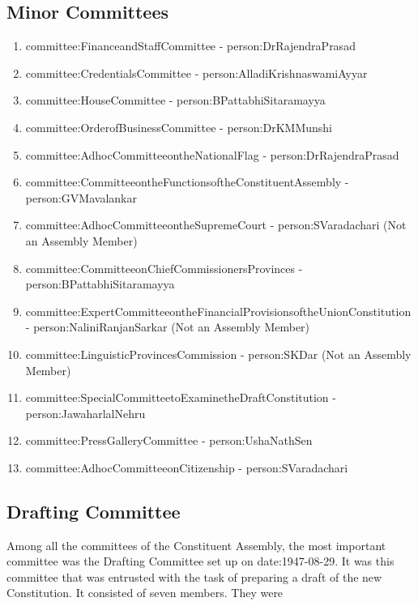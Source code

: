 \subsection{Minor Committees}

\begin{enumerate}
  \item \gls{committee:FinanceandStaffCommittee} - \gls{person:DrRajendraPrasad}
  \item \gls{committee:CredentialsCommittee} - \gls{person:AlladiKrishnaswamiAyyar}
  \item \gls{committee:HouseCommittee} - \gls{person:BPattabhiSitaramayya}
  \item \gls{committee:OrderofBusinessCommittee} - \gls{person:DrKMMunshi}
  \item \gls{committee:AdhocCommitteeontheNationalFlag} - \gls{person:DrRajendraPrasad}
  \item \gls{committee:CommitteeontheFunctionsoftheConstituentAssembly} - \gls{person:GVMavalankar}
  \item \gls{committee:AdhocCommitteeontheSupremeCourt} - \gls{person:SVaradachari} (Not an Assembly Member)
  \item \gls{committee:CommitteeonChiefCommissionersProvinces} - \gls{person:BPattabhiSitaramayya}
  \item \gls{committee:ExpertCommitteeontheFinancialProvisionsoftheUnionConstitution} - \gls{person:NaliniRanjanSarkar} (Not an Assembly Member)
  \item \gls{committee:LinguisticProvincesCommission} - \gls{person:SKDar} (Not an Assembly Member)
  \item \gls{committee:SpecialCommitteetoExaminetheDraftConstitution} - \gls{person:JawaharlalNehru}
  \item \gls{committee:PressGalleryCommittee} - \gls{person:UshaNathSen}
  \item \gls{committee:AdhocCommitteeonCitizenship} - \gls{person:SVaradachari}
\end{enumerate}


\subsection{Drafting Committee}

Among all the committees of the Constituent Assembly, the most important committee was the Drafting Committee set up on \gls{date:1947-08-29}. It was this committee that was entrusted with the task of preparing a draft of the new Constitution. It consisted of seven members. They were


